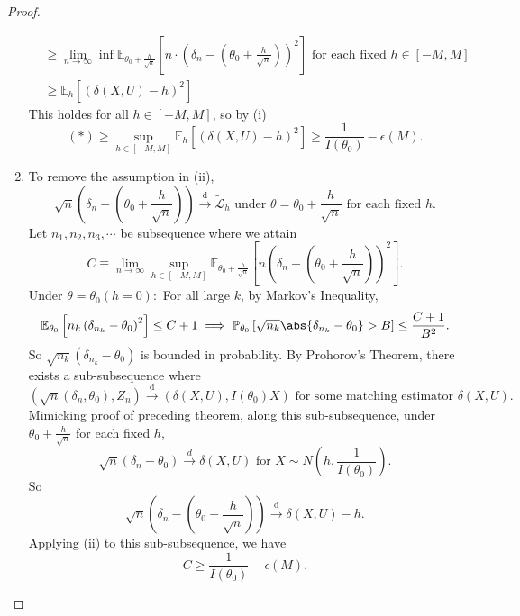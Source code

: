 \documentclass[a4paper]{article}
\begin{document}
\begin{proof}
\begin{enumerate}[leftmargin=*]
\begin{equation*}
\begin{aligned}
				& \geq \lim\limits_{n \to \infty} \inf \mathbb{E}_{\theta_0+\frac{h}{\sqrt{n}}} \left[n \cdot \left(\delta_n - \left(\theta_0 + \frac{h}{\sqrt{n}}\right)\right)^2\right] \text{ for each fixed $h \in [-M,M]$} \\
				& \geq \mathbb{E}_h \left[(\delta(X,U) - h)^2\right]
			\end{aligned}
		\end{equation*}
		This holdes for all $h \in [-M,M]$, so by (i)
		\begin{equation*}
			(\ast) \geq \sup\limits_{h \in [-M,M]} \mathbb{E}_h \left[(\delta(X,U) - h)^2\right] \geq \frac{1}{I(\theta_0)} - \epsilon(M).
		\end{equation*}
		\item To remove the assumption in (ii),
		\begin{equation*}
			\sqrt{n} \left(\delta_n - \left(\theta_0 + \frac{h}{\sqrt{n}}\right)\right) \stackrel{\text{d}}{\longrightarrow} \tilde{\mathcal{L}}_h \text{ under $\theta = \theta_0 + \frac{h}{\sqrt{n}}$ for each fixed $h$.}
		\end{equation*}
		Let $n_1,n_2,n_3,\cdots$ be subsequence where we attain
		\begin{equation*}
			C \equiv \lim\limits_{n \to \infty} \sup\limits_{h \in [-M,M]} \mathbb{E}_{\theta_0 + \frac{h}{\sqrt{n}}} \left[n \left(\delta_n - \left(\theta_0 + \frac{h}{\sqrt{n}}\right)\right)^2\right].
		\end{equation*}
		Under $\theta = \theta_0 (h = 0):$ For all large $k$, by Markov's Inequality, 
		\begin{equation*}
			\mathbb{E}_{\theta_0} \left[n_k \left(\delta_{n_k} - \theta_0\right)^2\right] \leq C + 1 \implies \mathbb{P}_{\theta_0} \left[\sqrt{n_k} \abs{\delta_{n_k} - \theta_0} > B\right] \leq \frac{C+1}{B^2}.
		\end{equation*}
		So $\sqrt{n_k}(\delta_{n_k} - \theta_0)$ is bounded in probability. By Prohorov's Theorem, there exists a sub-subsequence where
		\begin{equation*}
			\left(\sqrt{n}(\delta_n,\theta_0), Z_n\right) \stackrel{\text{d}}{\longrightarrow} (\delta(X,U),I(\theta_0)X) \text{ for some matching estimator $\delta(X,U)$}.
		\end{equation*}
		Mimicking proof of preceding theorem, along this sub-subsequence, under $\theta_0 + \frac{h}{\sqrt{n}}$ for each fixed $h$,
		\begin{equation*}
			\sqrt{n} \left(\delta_n - \theta_0\right) \stackrel{d}{\longrightarrow} \delta(X,U) \text{ for }  X \sim N\left(h, \frac{1}{I(\theta_0)}\right).
		\end{equation*}
		So
		\begin{equation*}
			\sqrt{n} \left(\delta_n - \left(\theta_0 + \frac{h}{\sqrt{n}}\right)\right) \stackrel{\text{d}}{\longrightarrow} \delta(X,U) - h.
		\end{equation*}
		Applying (ii) to this sub-subsequence, we have
		\begin{equation*}
			C \geq \frac{1}{I(\theta_0)} - \epsilon(M).
		\end{equation*}
	\end{enumerate}	
\end{proof}
\printindex
\end{document}
